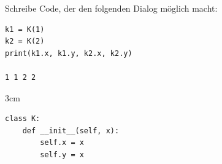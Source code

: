 \question[3]
Schreibe Code, der den folgenden Dialog möglich macht:

\begin{lstlisting}
k1 = K(1)
k2 = K(2)
print(k1.x, k1.y, k2.x, k2.y)

1 1 2 2
\end{lstlisting}
\begin{solutionbox}{3cm}
\begin{lstlisting}
class K:
    def __init__(self, x):
        self.x = x
        self.y = x
\end{lstlisting}
\end{solutionbox}

